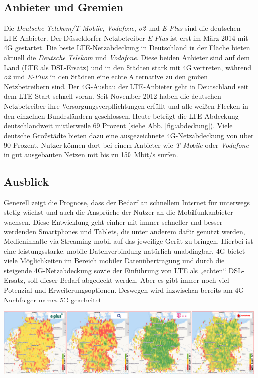 \begin{multicols}{3}

\subsection*{Anbieter und Gremien} 
Die \textit{Deutsche Telekom/T-Mobile}, \textit{Vodafone}, \textit{o2} und \textit{E-Plus} sind die deutschen LTE-Anbieter. Der Düsseldorfer Netzbetreiber \textit{E-Plus} ist erst im März 2014 mit 4G gestartet. Die beste LTE-Netzabdeckung in Deutschland in der Fläche bieten aktuell die \textit{Deutsche Telekom} und \textit{Vodafone}. Diese beiden Anbieter sind auf dem Land (LTE als DSL-Ersatz) und in den Städten stark mit 4G vertreten, während \textit{o2} und \textit{E-Plus} in den Städten eine echte Alternative zu den großen Netzbetreibern sind.
Der 4G-Ausbau der LTE-Anbieter geht in Deutschland seit dem LTE-Start schnell voran. Seit November 2012 haben die deutschen Netzbetreiber ihre Versorgungsverpflichtungen erfüllt und alle weißen Flecken in den einzelnen Bundesländern geschlossen. Heute beträgt die LTE-Abdeckung deutschlandweit mittlerweile 69 Prozent (siehe Abb. \ref{fig:abdeckung}). Viele deutsche Großstädte bieten dazu eine ausgezeichnete 4G-Netzabdeckung von über 90 Prozent. Nutzer können dort bei einem Anbieter wie \textit{T-Mobile} oder \textit{Vodafone} in gut ausgebauten Netzen mit bis zu \SI{150}{Mbit/s} surfen. ~\cite{4GLTE.7}

\subsection*{Ausblick}
Generell zeigt die Prognose, dass der Bedarf an schnellem Internet für unterwegs stetig wächst und auch die Ansprüche der Nutzer an die Mobilfunkanbieter wachsen. Diese Entwicklung geht einher mit immer schneller und besser werdenden Smartphones und Tablets, die unter anderem dafür genutzt werden, Medieninhalte via Streaming mobil auf das jeweilige Gerät zu bringen. Hierbei ist eine leistungsstarke, mobile Datenverbindung natürlich unabdingbar. 4G bietet viele Möglichkeiten im Bereich mobiler Datenübertragung und durch die steigende 4G-Netzabdeckung sowie der Einführung von LTE als „echten“ DSL-Ersatz, soll dieser Bedarf abgedeckt werden. Aber es gibt immer noch viel Potenzial und Erweiterungsoptionen. Deswegen wird inzwischen bereits am 4G-Nachfolger names 5G gearbeitet. 

\printbibliography[segment=9,heading=subbibliography]
\end{multicols}

\vspace{1cm}
\begin{Figure}
\includegraphics[width=\linewidth]{Kapitel/4GLTE/Grafiken/abdeckung.png}
\label{fig:abdeckung}
\end{Figure}

\newpage
